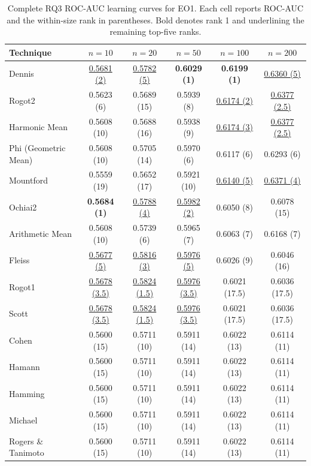 \begin{table}[t]
\centering
\caption{Complete RQ3 ROC-AUC learning curves for EO1. Each cell reports ROC-AUC and the within-size rank in parentheses. Bold denotes rank 1 and underlining the remaining top-five ranks.}
\label{tab:rq3v2-learning-curves-eo1}
{\scriptsize
\setlength{\tabcolsep}{5pt}
\begin{tabular}{lccccc}
\toprule
Technique & $n=10$ & $n=20$ & $n=50$ & $n=100$ & $n=200$ \\
\midrule
Dennis & \underline{0.5681 (2)} & \underline{0.5782 (5)} & \textbf{0.6029 (1)} & \textbf{0.6199 (1)} & \underline{0.6360 (5)} \\
Rogot2 & 0.5623 (6) & 0.5689 (15) & 0.5939 (8) & \underline{0.6174 (2)} & \underline{0.6377 (2.5)} \\
Harmonic Mean & 0.5608 (10) & 0.5688 (16) & 0.5938 (9) & \underline{0.6174 (3)} & \underline{0.6377 (2.5)} \\
Phi (Geometric Mean) & 0.5608 (10) & 0.5705 (14) & 0.5970 (6) & 0.6117 (6) & 0.6293 (6) \\
Mountford & 0.5559 (19) & 0.5652 (17) & 0.5921 (10) & \underline{0.6140 (5)} & \underline{0.6371 (4)} \\
Ochiai2 & \textbf{0.5684 (1)} & \underline{0.5788 (4)} & \underline{0.5982 (2)} & 0.6050 (8) & 0.6078 (15) \\
Arithmetic Mean & 0.5608 (10) & 0.5739 (6) & 0.5965 (7) & 0.6063 (7) & 0.6168 (7) \\
Fleiss & \underline{0.5677 (5)} & \underline{0.5816 (3)} & \underline{0.5976 (5)} & 0.6026 (9) & 0.6046 (16) \\
Rogot1 & \underline{0.5678 (3.5)} & \underline{0.5824 (1.5)} & \underline{0.5976 (3.5)} & 0.6021 (17.5) & 0.6036 (17.5) \\
Scott & \underline{0.5678 (3.5)} & \underline{0.5824 (1.5)} & \underline{0.5976 (3.5)} & 0.6021 (17.5) & 0.6036 (17.5) \\
Cohen & 0.5600 (15) & 0.5711 (10) & 0.5911 (14) & 0.6022 (13) & 0.6114 (11) \\
Hamann & 0.5600 (15) & 0.5711 (10) & 0.5911 (14) & 0.6022 (13) & 0.6114 (11) \\
Hamming & 0.5600 (15) & 0.5711 (10) & 0.5911 (14) & 0.6022 (13) & 0.6114 (11) \\
Michael & 0.5600 (15) & 0.5711 (10) & 0.5911 (14) & 0.6022 (13) & 0.6114 (11) \\
Rogers \& Tanimoto & 0.5600 (15) & 0.5711 (10) & 0.5911 (14) & 0.6022 (13) & 0.6114 (11) \\

\end{tabular}}
\end{table}
